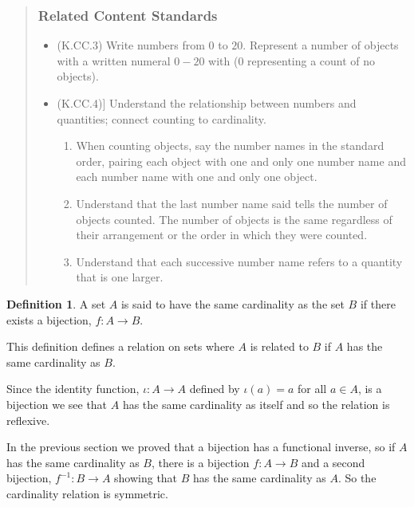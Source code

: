 \documentclass[
]{book}
\providecommand{\tightlist}{%
  \setlength{\itemsep}{0pt}\setlength{\parskip}{0pt}}
\theoremstyle{definition}
\newtheorem{definition}{Definition}[chapter]
\theoremstyle{definition}
\theoremstyle{definition}
\theoremstyle{remark}
\begin{document}
\begin{quote}
\hypertarget{related-content-standards-23}{%
\subsubsection*{Related Content Standards}\label{related-content-standards-23}}

\begin{itemize}
\tightlist
\item
  (K.CC.3) Write numbers from \(0\) to \(20\). Represent a number of objects with a written numeral \(0-20\) with (\(0\) representing a count of no objects).
\item
  (K.CC.4){]} Understand the relationship between numbers and quantities; connect counting to cardinality.

  \begin{enumerate}
  \def\labelenumi{\alph{enumi}.}
  \tightlist
  \item
    When counting objects, say the number names in the standard order, pairing each object with one and only one number name and each number name with one and only one object.
  \item
    Understand that the last number name said tells the number of objects counted. The number of objects is the same regardless of their arrangement or the order in which they were counted.
  \item
    Understand that each successive number name refers to a quantity that is one larger.
  \end{enumerate}
\end{itemize}
\end{quote}

\begin{definition}
\protect\hypertarget{def:unnamed-chunk-145}{}{\label{def:unnamed-chunk-145} }A set \(A\) is said to have the same cardinality as the set \(B\) if there exists a bijection, \(f:A\rightarrow B\).
\end{definition}

This definition defines a relation on sets where \(A\) is related to \(B\) if \(A\) has the same cardinality as \(B\).

Since the identity function, \(\iota :A \rightarrow A\) defined by \(\iota(a)=a\) for all \(a\in A\), is a bijection we see that \(A\) has the same cardinality as itself and so the relation is reflexive.

In the previous section we proved that a bijection has a functional inverse, so if \(A\) has the same cardinality as \(B\), there is a bijection \(f:A\rightarrow B\) and a second bijection, \(f^{-1}:B\rightarrow A\) showing that \(B\) has the same cardinality as \(A\). So the cardinality relation is symmetric.
\end{document}

